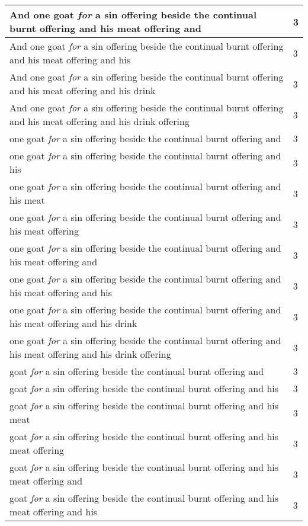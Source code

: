 \begin{center}
\begin{longtable}{|p{3.0in}|p{0.5in}|}
And one goat \emph{for} a sin offering beside the continual burnt offering and his meat offering and & 3\\ \hline 
And one goat \emph{for} a sin offering beside the continual burnt offering and his meat offering and his & 3\\ \hline 
And one goat \emph{for} a sin offering beside the continual burnt offering and his meat offering and his drink & 3\\ \hline 
And one goat \emph{for} a sin offering beside the continual burnt offering and his meat offering and his drink offering & 3\\ \hline 
one goat \emph{for} a sin offering beside the continual burnt offering and & 3\\ \hline 
one goat \emph{for} a sin offering beside the continual burnt offering and his & 3\\ \hline 
one goat \emph{for} a sin offering beside the continual burnt offering and his meat & 3\\ \hline 
one goat \emph{for} a sin offering beside the continual burnt offering and his meat offering & 3\\ \hline 
one goat \emph{for} a sin offering beside the continual burnt offering and his meat offering and & 3\\ \hline 
one goat \emph{for} a sin offering beside the continual burnt offering and his meat offering and his & 3\\ \hline 
one goat \emph{for} a sin offering beside the continual burnt offering and his meat offering and his drink & 3\\ \hline 
one goat \emph{for} a sin offering beside the continual burnt offering and his meat offering and his drink offering & 3\\ \hline 
goat \emph{for} a sin offering beside the continual burnt offering and & 3\\ \hline 
goat \emph{for} a sin offering beside the continual burnt offering and his & 3\\ \hline 
goat \emph{for} a sin offering beside the continual burnt offering and his meat & 3\\ \hline 
goat \emph{for} a sin offering beside the continual burnt offering and his meat offering & 3\\ \hline 
goat \emph{for} a sin offering beside the continual burnt offering and his meat offering and & 3\\ \hline 
goat \emph{for} a sin offering beside the continual burnt offering and his meat offering and his & 3\\ \hline 

\end{longtable}
\end{center}
